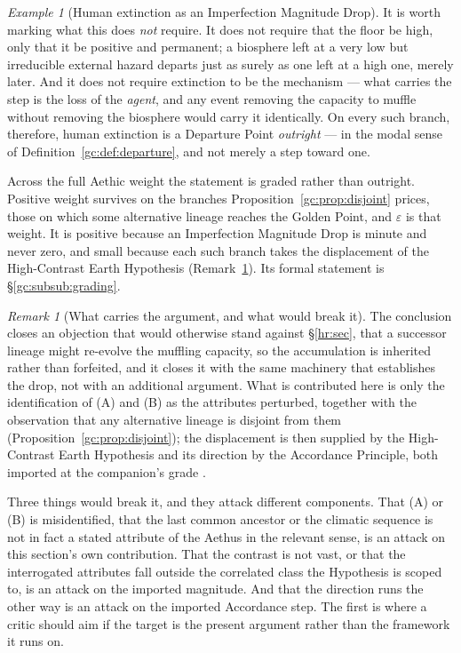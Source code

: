 \documentclass[11pt]{article}
\numberwithin{equation}{section}
\theoremstyle{plain}
\theoremstyle{definition}
\theoremstyle{remark}
\newtheorem{remark}[theorem]{Remark}
\newtheorem{example}[theorem]{Example}
\begin{document}
\begin{example}[Human extinction as an Imperfection Magnitude Drop]
It is worth marking what this does \emph{not} require. It does not
require that the floor be high, only that it be positive and permanent;
a biosphere left at a very low but irreducible external hazard departs
just as surely as one left at a high one, merely later. And it does not
require extinction to be the mechanism --- what carries the step is the
loss of the \emph{agent}, and any event removing the capacity to muffle
without removing the biosphere would carry it identically.
On every such branch, therefore, human extinction is a Departure Point
\emph{outright} --- in the modal sense of
Definition~\ref{gc:def:departure}, and not merely a step toward one.

Across the full Aethic weight the statement is graded rather than
outright. Positive weight survives on the branches
Proposition~\ref{gc:prop:disjoint} prices, those on which some
alternative lineage reaches the Golden Point, and $\varepsilon$ is
that weight. It is positive because an Imperfection Magnitude Drop is
minute and never zero, and small because each such branch takes the
displacement of the High-Contrast Earth Hypothesis
(Remark~\ref{gc:rem:whatcarries}). Its formal statement is
\S\ref{gc:subsub:grading}.

\begin{remark}[What carries the argument, and what would break it]
\label{gc:rem:whatcarries}
The conclusion closes an objection that would otherwise stand against
\S\ref{hr:sec}, that a successor lineage might re-evolve the muffling
capacity, so the accumulation is inherited rather than forfeited, and
it closes it with the same machinery that establishes the drop, not
with an additional argument. What is contributed here is only the
identification of (A) and (B) as the attributes perturbed, together
with the observation that any alternative lineage is disjoint from them
(Proposition~\ref{gc:prop:disjoint}); the displacement is then supplied
by the High-Contrast Earth Hypothesis and its direction by the
Accordance Principle, both imported at the companion's grade
\cite{Nexus, Ben26Optimal}.

Three things would break it, and they attack different components.
That (A) or (B) is misidentified, that the last common ancestor or
the climatic sequence is not in fact a stated attribute of the Aethus in
the relevant sense, is an attack on this section's own contribution.
That the contrast is not vast, or that the interrogated attributes fall
outside the correlated class the Hypothesis is scoped to, is an attack
on the imported magnitude. And that the direction runs the other way is
an attack on the imported Accordance step. The first is where a critic
should aim if the target is the present argument rather than the
framework it runs on.
\end{remark}
\end{example}
\end{document}
